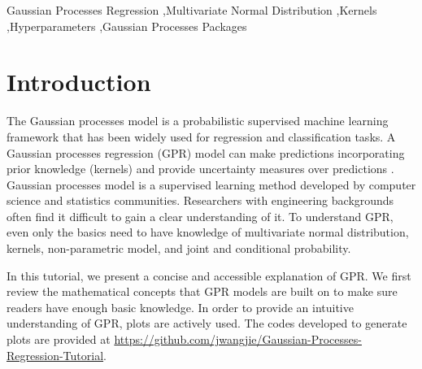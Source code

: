 \documentclass[preprint,12pt]{elsarticle}
\begin{document}
\begin{frontmatter}


\begin{keyword}
Gaussian Processes Regression \sep Multivariate Normal Distribution \sep Kernels \sep  Hyperparameters \sep Gaussian Processes Packages 
\end{keyword}

\end{frontmatter}


\section{Introduction}
The Gaussian processes model is a probabilistic supervised machine learning framework that has been widely used for regression and classification tasks. A Gaussian processes regression (GPR) model can make predictions incorporating prior knowledge (kernels) and provide uncertainty measures over predictions \cite{Rasmussen2006}. Gaussian processes model is a supervised learning method developed by computer science and statistics communities. Researchers with engineering backgrounds often find it difficult to gain a clear understanding of it. To understand GPR, even only the basics need to have knowledge of multivariate normal distribution, kernels, non-parametric model, and joint and conditional probability. 

In this tutorial, we present a concise and accessible explanation of GPR. We first review the mathematical concepts that GPR models are built on to make sure readers have enough basic knowledge. In order to provide an intuitive understanding of GPR, plots are actively used. The codes developed to generate plots are provided at \url{https://github.com/jwangjie/Gaussian-Processes-Regression-Tutorial}. 
\end{document}
